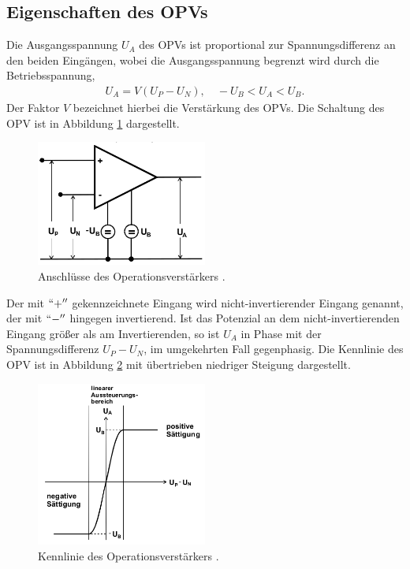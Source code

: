 \subsection{Eigenschaften des OPVs}
Die Ausgangsspannung $U_A$ des OPVs ist proportional zur Spannungsdifferenz an den beiden Eingängen, wobei
die Ausgangsspannung begrenzt wird durch die Betriebsspannung,
\begin{align}
 U_A = V(U_P - U_N), \quad -U_B < U_A < U_B.
 \label{eq:Uaus}
\end{align}
Der Faktor $V$ bezeichnet hierbei die Verstärkung des OPVs. Die Schaltung des OPV ist in Abbildung \ref{pic:basic}
dargestellt. 
\begin{figure}[t]
 \includegraphics[width = 0.5\textwidth]{../pics/OPVBasic.png}
 \caption{Anschlüsse des Operationsverstärkers \cite{Anl}.}
 \label{pic:basic}
\end{figure}
Der mit $``+''$ gekennzeichnete Eingang wird nicht-invertierender Eingang genannt, der mit $``-''$ hingegen
invertierend. Ist das Potenzial an dem nicht-invertierenden Eingang größer als am Invertierenden,
so ist $U_A$ in Phase mit der Spannungsdifferenz $U_P-U_N$, im umgekehrten Fall gegenphasig. Die Kennlinie
des OPV ist in Abbildung \ref{pic:linie} mit übertrieben niedriger Steigung dargestellt.
\begin{figure}[t]
 \includegraphics[width = 0.5\textwidth]{../pics/OPVLinie.png}
 \caption{Kennlinie des Operationsverstärkers \cite{Anl}.}
 \label{pic:linie}
\end{figure}
